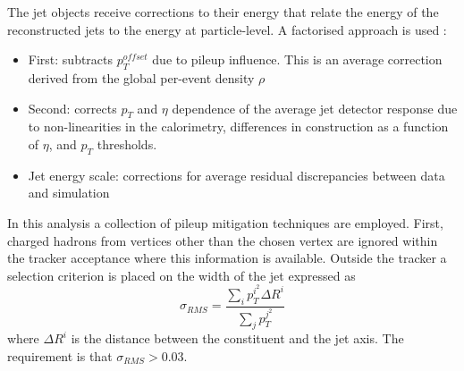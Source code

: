 The jet objects receive corrections to their energy that relate the energy of the reconstructed jets to the energy at particle-level. A factorised approach is used \cite{JetPerformance}:
\begin{itemize}[noitemsep]
    \item First: subtracts $p_{T}^{offset}$ due to pileup influence. This is an average correction derived from the global per-event density $\rho$
    \item Second: corrects $p_{T}$ and $\eta$ dependence of the average jet detector response due to non-linearities in the calorimetry, differences in construction as a function of $\eta$, and $p_{T}$ thresholds.
    \item Jet energy scale: corrections for average residual discrepancies between data and simulation
\end{itemize}

In this analysis a collection of pileup mitigation techniques are employed. First, charged hadrons from vertices other than the chosen vertex are ignored within the tracker acceptance where this information is available. Outside the tracker a selection criterion is placed on the width of the jet expressed as
\begin{equation}
    \sigma_{RMS} = \frac{\sum_{i}p_{T}^{i^2}\Delta{R}^{i}}{\sum_{j}p_{T}^{j^2}}
\end{equation}
where $\Delta{R}^{i}$ is the distance between the constituent and the jet axis. The requirement is that $\sigma_{RMS} > 0.03$. 



